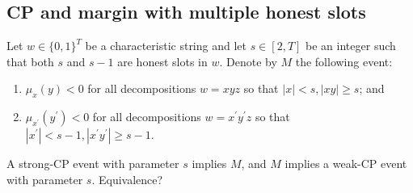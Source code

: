 \subsection{CP and margin with multiple honest slots}
  \begin{conjecture}\label{thm:multiple-honest-cp-margin}
    Let $w \in \{0,1\}^T$ be a characteristic string 
    and let $s \in[2, T]$ be an integer such that 
    both $s$ and $s - 1$ are honest slots in $w$.  
    Denote by $M$ the following event:
    \begin{enumerate}[label=\roman*.]
      \item $\mu_{x}(y) < 0$ 
      for all decompositions $w = xyz$ 
      so that $|x| < s, |xy| \geq s$; and 
      \item $\mu_{x^\prime}(y^\prime) < 0$ 
      for all decompositions $w = x^\prime y^\prime z$ 
      so that $|x^\prime| < s - 1, |x^\prime y^\prime| \geq s - 1$. 
    \end{enumerate}       
    A strong-CP event with parameter $s$ implies $M$, 
    and 
    $M$ implies a weak-CP event with parameter $s$.
    {\color{blue} Equivalence?}
  \end{conjecture}


